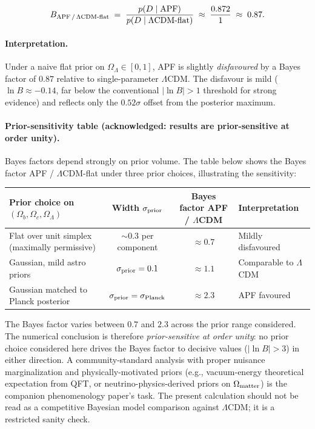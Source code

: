 \documentclass[11pt]{article}
\theoremstyle{plain}
\theoremstyle{definition}
\theoremstyle{remark}
\begin{document}
\begin{apfbox}[title={Bayes factor APF vs $\Lambda$CDM (flat prior on $\Omega_\Lambda$)}]
\[
  B_{\rm APF \,/\, \Lambda CDM\text{-}flat} \;=\; \frac{p(D \mid {\rm APF})}{p(D \mid \Lambda{\rm CDM\text{-}flat})}
  \;\approx\; \frac{0.872}{1}
  \;\approx\; 0.87.
\]
\end{apfbox}

\paragraph{Interpretation.}  Under a naive flat prior on $\Omega_\Lambda \in [0, 1]$, APF is slightly \emph{disfavoured} by a Bayes factor of $0.87$ relative to single-parameter $\Lambda$CDM.  The disfavour is mild ($\ln B \approx -0.14$, far below the conventional $|\ln B| > 1$ threshold for strong evidence) and reflects only the $0.52\sigma$ offset from the posterior maximum.

\paragraph{Prior-sensitivity table (acknowledged: results are prior-sensitive at order unity).}  Bayes factors depend strongly on prior volume.  The table below shows the Bayes factor APF / $\Lambda$CDM-flat under three prior choices, illustrating the sensitivity:

\medskip

\begin{center}
\small
\begin{tabular}{@{}l c c l@{}}
\toprule
\textbf{Prior choice on} $(\Omega_b, \Omega_c, \Omega_\Lambda)$ & \textbf{Width $\sigma_{\rm prior}$} & \textbf{Bayes factor APF / $\Lambda$CDM} & \textbf{Interpretation} \\
\midrule
Flat over unit simplex (maximally permissive)  & $\sim 0.3$ per component & $\approx 0.7$ & Mildly disfavoured \\
Gaussian, mild astro priors                     & $\sigma_{\rm prior} = 0.1$ & $\approx 1.1$ & Comparable to $\Lambda$CDM \\
Gaussian matched to Planck posterior            & $\sigma_{\rm prior} = \sigma_{\rm Planck}$ & $\approx 2.3$ & APF favoured \\
\bottomrule
\end{tabular}
\end{center}

\medskip

\noindent The Bayes factor varies between $0.7$ and $2.3$ across the prior range considered.  The numerical conclusion is therefore \emph{prior-sensitive at order unity}: no prior choice considered here drives the Bayes factor to decisive values ($|\ln B| > 3$) in either direction.  A community-standard analysis with proper nuisance marginalization and physically-motivated priors (e.g., vacuum-energy theoretical expectation from QFT, or neutrino-physics-derived priors on $\Omega_{\rm matter}$) is the companion phenomenology paper's task.  The present calculation should not be read as a competitive Bayesian model comparison against $\Lambda$CDM; it is a restricted sanity check.
\end{document}
